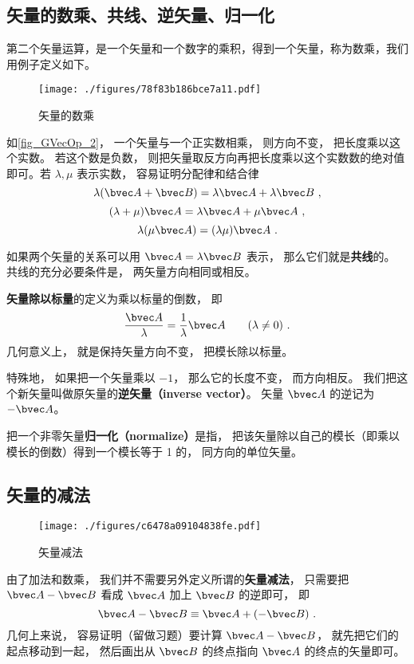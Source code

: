 \subsection{矢量的数乘、共线、逆矢量、归一化}\label{sub_GVecOp_1}
第二个矢量运算，是一个矢量和一个数字的乘积，得到一个矢量，称为数乘，我们用例子定义如下。

\begin{figure}[ht]
\centering
\texttt{[image: ./figures/78f83b186bce7a11.pdf]}
\caption{矢量的数乘} \label{fig_GVecOp_2}
\end{figure}

如\autoref{fig_GVecOp_2}， 一个矢量与一个正实数相乘， 则方向不变， 把长度乘以这个实数。 若这个数是负数， 则把矢量取反方向再把长度乘以这个实数数的绝对值即可。若 $\lambda, \mu$ 表示实数， 容易证明分配律和结合律
\begin{equation}
\lambda(\bvec A + \bvec B) = \lambda\bvec A + \lambda\bvec B~,
\end{equation}
\begin{equation}
(\lambda+\mu)\bvec A = \lambda\bvec A + \mu\bvec A~,
\end{equation}
\begin{equation}
\lambda(\mu\bvec A) = (\lambda\mu) \bvec A~.
\end{equation}

如果两个矢量的关系可以用 $\bvec A = \lambda\bvec B$ 表示， 那么它们就是\textbf{共线}的。 共线的充分必要条件是， 两矢量方向相同或相反。

\textbf{矢量除以标量}的定义为乘以标量的倒数， 即
\begin{equation}
\frac{\bvec A}{\lambda} = \frac{1}{\lambda} \bvec A \qquad (\lambda \ne 0)~.
\end{equation}
几何意义上， 就是保持矢量方向不变， 把模长除以标量。

特殊地， 如果把一个矢量乘以 $-1$， 那么它的长度不变， 而方向相反。 我们把这个新矢量叫做原矢量的\textbf{逆矢量（inverse vector）}。 矢量 $\bvec A$ 的逆记为 $-\bvec A$。

把一个非零矢量\textbf{归一化（normalize）}是指， 把该矢量除以自己的模长（即乘以模长的倒数）得到一个模长等于 1 的， 同方向的单位矢量。

\subsection{矢量的减法}

\begin{figure}[ht]
\centering
\texttt{[image: ./figures/c6478a09104838fe.pdf]}
\caption{矢量减法} \label{fig_GVecOp_3}
\end{figure}
由了加法和数乘， 我们并不需要另外定义所谓的\textbf{矢量减法}， 只需要把 $\bvec A - \bvec B$ 看成 $\bvec A$ 加上 $\bvec B$ 的逆即可， 即
\begin{equation}
\bvec A - \bvec B \equiv \bvec A + (-\bvec B)~.
\end{equation}
几何上来说， 容易证明（留做习题）要计算 $\bvec A - \bvec B$， 就先把它们的起点移动到一起， 然后画出从 $\bvec B$ 的终点指向 $\bvec A$ 的终点的矢量即可。

